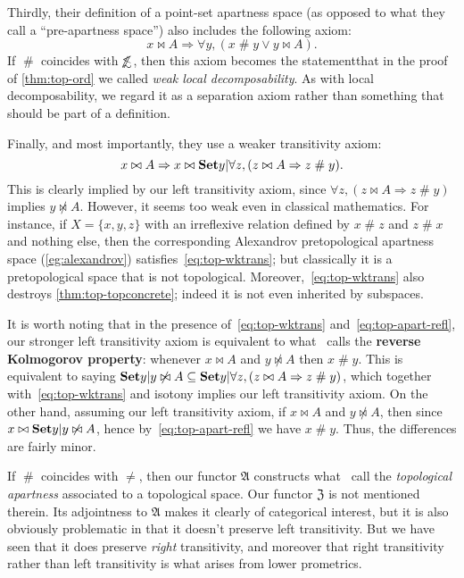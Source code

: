 \documentclass{article}
\def\apart{\mathrel{\#}}
\def\oapt{\mathrel{\!\not\,\not\lesssim}}
\let\implies\Rightarrow
\def\anti{\mathfrak{A}}
\def\neigh{\mathfrak{Z}}
\begin{document}
Thirdly, their definition of a point-set apartness space (as opposed to what they call a ``pre-apartness space'') also includes the following axiom:
\[ x\bowtie A \implies \forall y, (x\apart y \lor y\bowtie A). \]
If $\apart$ coincides with $\oapt$, then this axiom becomes the statementthat in the proof of \cref{thm:top-ord} we called \emph{weak local decomposability}.
As with local decomposability, we regard it as a separation axiom rather than something that should be part of a definition.

Finally, and most importantly, they use a weaker transitivity axiom:
\begin{equation}
  x\bowtie A \implies x \bowtie \setof{ y | \forall z, (z\bowtie A \implies z\apart y)}.\label{eq:top-wktrans}
\end{equation}
This is clearly implied by our left transitivity axiom, since $\forall z, (z\bowtie A \implies z\apart y)$ implies $y\not\bowtie A$.
However, it seems too weak even in classical mathematics.
For instance, if $X = \{x,y,z\}$ with an irreflexive relation defined by $x\apart z$ and $z\apart x$ and nothing else, then the corresponding Alexandrov pretopological apartness space (\cref{eg:alexandrov}) satisfies~\eqref{eq:top-wktrans}; but classically it is a pretopological space that is not topological.
Moreover,~\eqref{eq:top-wktrans} also destroys \cref{thm:top-topconcrete}; indeed it is not even inherited by subspaces.

It is worth noting that in the presence of~\eqref{eq:top-wktrans} and~\eqref{eq:top-apart-refl}, our stronger left transitivity axiom is equivalent to what~\cite{bridges-vita} calls the \textbf{reverse Kolmogorov property}: whenever $x\bowtie A$ and $y\not\bowtie A$ then $x\apart y$.
This is equivalent to saying $\setof{y|y\not\bowtie A} \subseteq \setof{ y | \forall z, (z\bowtie A \implies z\apart y)}$, which together with~\eqref{eq:top-wktrans} and isotony implies our left transitivity axiom.
On the other hand, assuming our left transitivity axiom, if $x\bowtie A$ and $y\not\bowtie A$, then since $x\bowtie \setof{y|y\not\bowtie A}$, hence by~\eqref{eq:top-apart-refl} we have $x\apart y$.
Thus, the differences are fairly minor.

If $\apart$ coincides with $\neq$, then our functor $\anti$ constructs what~\cite{bridges-vita} call the \emph{topological apartness} associated to a topological space.
Our functor $\neigh$ is not mentioned therein.
Its adjointness to $\anti$ makes it clearly of categorical interest, but it is also obviously problematic in that it doesn't preserve left transitivity.
But we have seen that it does preserve \emph{right} transitivity, and moreover that right transitivity rather than left transitivity is what arises from lower prometrics.
\end{document}
